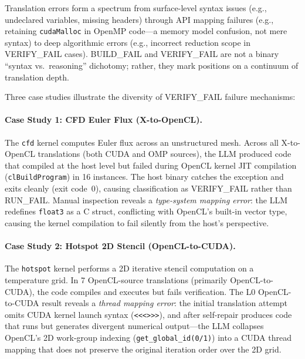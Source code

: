 \documentclass[conference]{IEEEtran}
\begin{document}
Translation errors form a spectrum from surface-level syntax issues
(e.g., undeclared variables, missing headers) through API mapping
failures (e.g., retaining \texttt{cudaMalloc} in OpenMP code---a
memory model confusion, not mere syntax) to deep algorithmic
errors (e.g., incorrect reduction scope in VERIFY\_FAIL cases).
BUILD\_FAIL and VERIFY\_FAIL are not a binary ``syntax vs.\ reasoning''
dichotomy; rather, they mark positions on a continuum of translation
depth.

Three case studies illustrate the diversity of VERIFY\_FAIL failure mechanisms:

\paragraph{Case Study 1: CFD Euler Flux (X-to-OpenCL).}
The \texttt{cfd} kernel computes Euler flux across an unstructured mesh.
Across all X-to-OpenCL translations (both CUDA and OMP sources),
the LLM produced code that compiled at the host level but failed
during OpenCL kernel JIT compilation (\texttt{clBuildProgram}) in 16
instances. The host binary catches the exception and exits cleanly
(exit code~0), causing classification as VERIFY\_FAIL rather than
RUN\_FAIL. Manual inspection reveals a \emph{type-system mapping error}:
the LLM redefines \texttt{float3} as a C struct, conflicting with
OpenCL's built-in vector type, causing the kernel compilation to fail
silently from the host's perspective.

\paragraph{Case Study 2: Hotspot 2D Stencil (OpenCL-to-CUDA).}
The \texttt{hotspot} kernel performs a 2D iterative stencil computation
on a temperature grid. In 7 OpenCL-source translations (primarily
OpenCL-to-CUDA), the code compiles and executes but fails
verification. The L0 OpenCL-to-CUDA result reveals a \emph{thread
mapping error}: the initial translation attempt omits CUDA kernel
launch syntax (\texttt{<<<>>>}), and after self-repair produces code
that runs but generates divergent numerical output---the LLM
collapses OpenCL's 2D work-group indexing
(\texttt{get\_global\_id(0/1)}) into a CUDA thread mapping that
does not preserve the original iteration order over the 2D grid.
\end{document}
